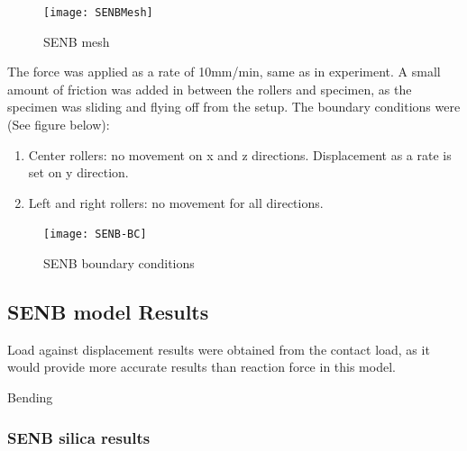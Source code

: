 \documentclass[numbers=noendperiod,chapterprefix=on]{icldt} %
\begin{document}
{\begin{figure}[!t]
\centering
\texttt{[image: SENBMesh]}
\caption{SENB mesh}\label{SENBMesh}
\end{figure}
\FloatBarrier

The force was applied as a rate of 10mm/min, same as in experiment. A small amount of friction was added in between the rollers and specimen, as the specimen was sliding and flying off from the setup.\newline
The boundary conditions were (See figure below): %

\begin{enumerate}
\item Center rollers: no movement on x and z directions. Displacement as a rate is set on y direction.

\item Left and right rollers: no movement for all directions.
\end{enumerate}

\begin{figure}[!hp]
\centering
\texttt{[image: SENB-BC]}\label{SENB-BC}
\caption{SENB boundary conditions}
\end{figure}
\FloatBarrier

\subsection{SENB model Results}
Load against displacement results were obtained from the contact load, as it would provide more accurate results than reaction force in this model.

Bending


\subsubsection{SENB silica results}

}
\end{document}
